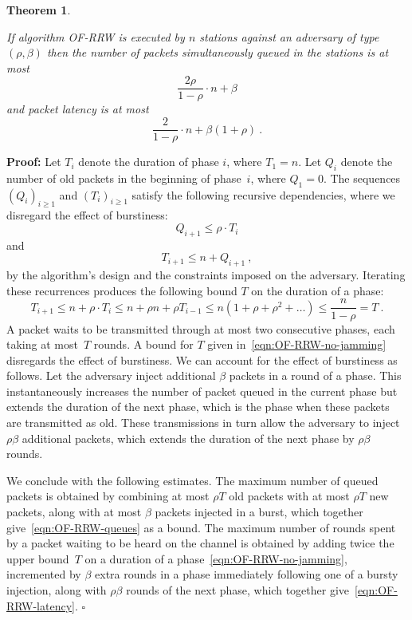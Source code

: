 \documentclass[11pt]{article}
\newcommand{\qed}{\hfill $\square$}
\newtheorem{theorem}{Theorem}
\newenvironment{proof}{\noindent\textbf{Proof: }}{\qed \smallbreak}
\begin{document}

\begin{theorem}
\label{thm:OF-RRW}

If algorithm \textsc{OF-RRW}  is executed  by $n$ stations  against an adversary of type~$(\rho,\beta)$  then the number of packets simultaneously queued in the stations is at most
\begin{equation}
\label{eqn:OF-RRW-queues}
\frac{2\rho }{1-\rho}\cdot n +\beta
\end{equation}
and packet latency is at most
\begin{equation}
\label{eqn:OF-RRW-latency}
\frac{2}{1-\rho}\cdot n +\beta(1+\rho)
\ .
\end{equation}
\end{theorem}



\begin{proof}
Let $T_i$ denote the duration of phase $i$, where $T_1=n$.
Let $Q_i$ denote the number of old packets in the beginning of phase~$i$, where $Q_1=0$.
The sequences $(Q_i)_{i\ge 1}$ and $(T_i)_{i\ge 1}$ satisfy the following recursive dependencies, where we disregard the effect of burstiness:
\[
Q_{i+1}\le \rho\cdot T_i
\]
and 
\[
T_{i+1}\le n+Q_{i+1}
\ ,
\]
by the algorithm's design and the constraints imposed on the adversary.
Iterating these recurrences produces the following bound $T$ on the duration of a phase:
\begin{equation}
\label{eqn:OF-RRW-no-jamming}
T_{i+1} \le n + \rho\cdot T_i \le n+ \rho n + \rho T_{i-1} \le n(1+\rho+\rho^2+\ldots)\le \frac{n}{1-\rho} =T
\ .
\end{equation}
A packet waits to be transmitted through at most two consecutive phases, each taking at most~$T$ rounds.
A bound for $T$ given in~\eqref{eqn:OF-RRW-no-jamming} disregards the effect of burstiness.
We can account for the effect of burstiness as follows.
Let the adversary inject additional $\beta$ packets in a round of a phase.
This instantaneously increases the number of packet queued in the current phase but extends the duration of the next phase, which is the phase when these packets are transmitted as old.
These transmissions in turn allow the adversary to inject $\rho \beta$ additional packets, which extends the duration of the next phase by $\rho \beta$ rounds.

We conclude with the following estimates.
The maximum number of queued packets is obtained by combining at most $\rho T$ old packets with  at most $\rho T$ new packets, along with at most $\beta$ packets injected in a burst, which together give~\eqref{eqn:OF-RRW-queues} as a bound.
The maximum number of rounds spent by a packet waiting to be heard on the channel is obtained by adding twice the upper bound~$T$ on a duration of a phase~\eqref{eqn:OF-RRW-no-jamming}, incremented by $\beta$ extra rounds in a phase immediately following one of a bursty injection, along with $\rho\beta$ rounds of the next phase, which together give~\eqref{eqn:OF-RRW-latency}.
\end{proof}
\end{document}
